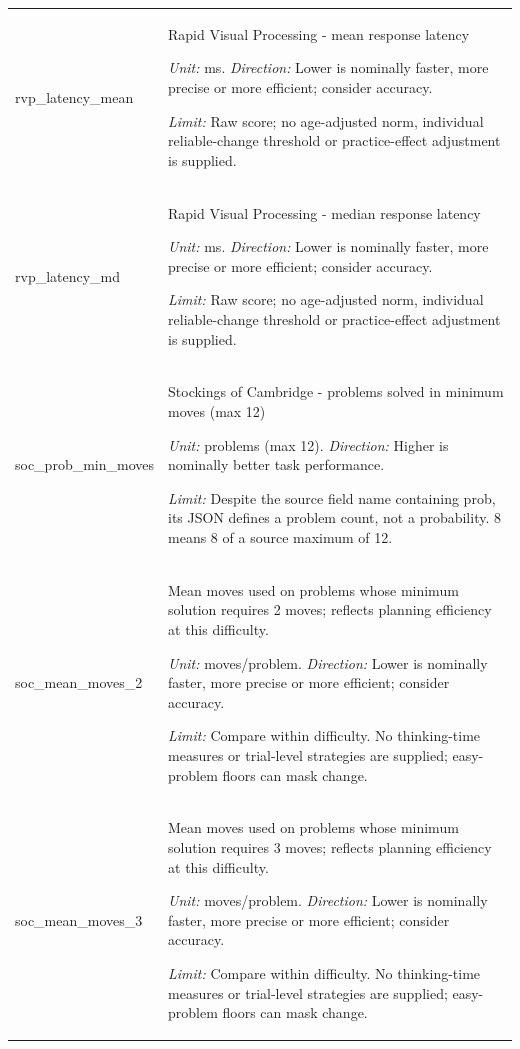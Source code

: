 \begin{longtable}{p{.26\linewidth}p{.66\linewidth}}
{\ttfamily\footnotesize rvp\_\allowbreak{}latency\_\allowbreak{}mean} & Rapid Visual Processing - mean response latency\par\textit{Unit:} ms. \textit{Direction:} Lower is nominally faster, more precise or more efficient; consider accuracy.\par\textit{Limit:} Raw score; no age-adjusted norm, individual reliable-change threshold or practice-effect adjustment is supplied. \\[7pt]
{\ttfamily\footnotesize rvp\_\allowbreak{}latency\_\allowbreak{}md} & Rapid Visual Processing - median response latency\par\textit{Unit:} ms. \textit{Direction:} Lower is nominally faster, more precise or more efficient; consider accuracy.\par\textit{Limit:} Raw score; no age-adjusted norm, individual reliable-change threshold or practice-effect adjustment is supplied. \\[7pt]
{\ttfamily\footnotesize soc\_\allowbreak{}prob\_\allowbreak{}min\_\allowbreak{}moves} & Stockings of Cambridge - problems solved in minimum moves (max 12)\par\textit{Unit:} problems (max 12). \textit{Direction:} Higher is nominally better task performance.\par\textit{Limit:} Despite the source field name containing prob, its JSON defines a problem count, not a probability. 8 means 8 of a source maximum of 12. \\[7pt]
{\ttfamily\footnotesize soc\_\allowbreak{}mean\_\allowbreak{}moves\_\allowbreak{}2} & Mean moves used on problems whose minimum solution requires 2 moves; reflects planning efficiency at this difficulty.\par\textit{Unit:} moves/problem. \textit{Direction:} Lower is nominally faster, more precise or more efficient; consider accuracy.\par\textit{Limit:} Compare within difficulty. No thinking-time measures or trial-level strategies are supplied; easy-problem floors can mask change. \\[7pt]
{\ttfamily\footnotesize soc\_\allowbreak{}mean\_\allowbreak{}moves\_\allowbreak{}3} & Mean moves used on problems whose minimum solution requires 3 moves; reflects planning efficiency at this difficulty.\par\textit{Unit:} moves/problem. \textit{Direction:} Lower is nominally faster, more precise or more efficient; consider accuracy.\par\textit{Limit:} Compare within difficulty. No thinking-time measures or trial-level strategies are supplied; easy-problem floors can mask change. \\[7pt]

\end{longtable}
